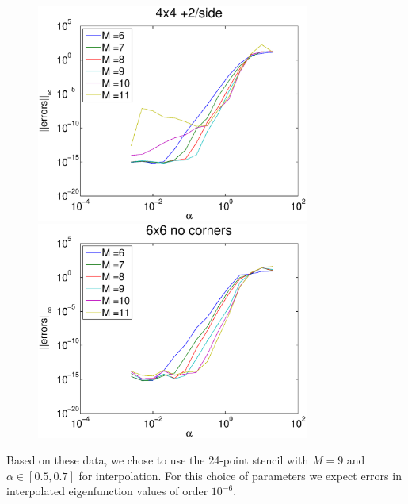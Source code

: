 \documentclass{report}
\begin{document}
\begin{figure}
  \begin{center}
    \includegraphics[width=0.8\textwidth]{figs/interpolation/error_norms_3.eps}
    \linebreak
    \includegraphics[width=0.8\textwidth]{figs/interpolation/error_norms_4.eps}
  \end{center}
\end{figure}

Based on these data, we chose to use the 24-point stencil with $M=9$ and $\alpha \in [0.5, 0.7]$ for interpolation. For this choice of parameters we expect errors in interpolated eigenfunction values of order $10^{-6}$.

%
\end{document}
